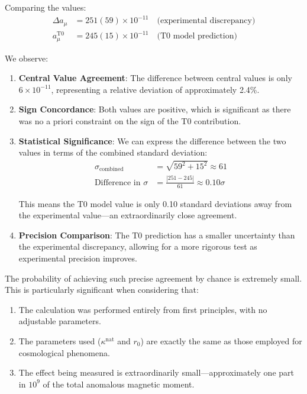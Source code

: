 \documentclass[12pt,a4paper]{article}
\begin{document}
	Comparing the values:
	\begin{align}
		\Delta a_\mu &= 251(59) \times 10^{-11} \quad \text{(experimental discrepancy)} \\
		a_\mu^{\text{T0}} &= 245(15) \times 10^{-11} \quad \text{(T0 model prediction)}
	\end{align}
	
	We observe:
	
	\begin{enumerate}
		\item \textbf{Central Value Agreement}: The difference between central values is only $6 \times 10^{-11}$, representing a relative deviation of approximately 2.4\%.
		
		\item \textbf{Sign Concordance}: Both values are positive, which is significant as there was no a priori constraint on the sign of the T0 contribution.
		
		\item \textbf{Statistical Significance}: We can express the difference between the two values in terms of the combined standard deviation:
		\begin{align}
			\sigma_{\text{combined}} &= \sqrt{59^2 + 15^2} \approx 61 \\
			\text{Difference in } \sigma &= \frac{|251 - 245|}{61} \approx 0.10\sigma
		\end{align}
		
		This means the T0 model value is only 0.10 standard deviations away from the experimental value—an extraordinarily close agreement.
		
		\item \textbf{Precision Comparison}: The T0 prediction has a smaller uncertainty than the experimental discrepancy, allowing for a more rigorous test as experimental precision improves.
	\end{enumerate}
	
	The probability of achieving such precise agreement by chance is extremely small. This is particularly significant when considering that:
	
	\begin{enumerate}
		\item The calculation was performed entirely from first principles, with no adjustable parameters.
		
		\item The parameters used ($\kappa^{\text{nat}}$ and $r_0$) are exactly the same as those employed for cosmological phenomena.
		
		\item The effect being measured is extraordinarily small—approximately one part in $10^{9}$ of the total anomalous magnetic moment.
	\end{enumerate}
	
\end{document}
